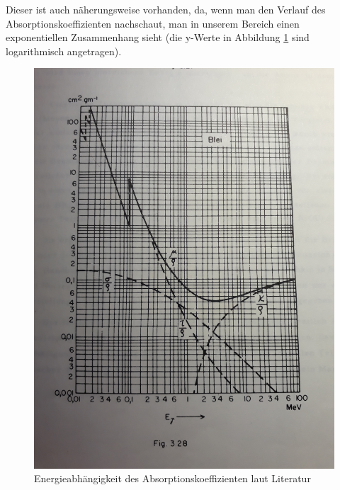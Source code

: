 Dieser ist auch näherungsweise vorhanden, da, wenn man den Verlauf des Absorptionskoeffizienten nachschaut, man in unserem Bereich einen 
exponentiellen Zusammenhang sieht (die y-Werte in Abbildung \ref{AbsLit} sind logarithmisch angetragen).


\begin{figure}
    \captionsetup{justification=centering,margin=2cm}
    \centering
    \includegraphics[width = 12cm, angle = -90]{Bilder/Auswertung/AbsMamier.jpg}
    \caption{Energieabhängigkeit des Absorptionskoeffizienten laut Literatur \cite[S.46a]{Mamier1977}}
    \label{AbsLit}
    
\end{figure}
